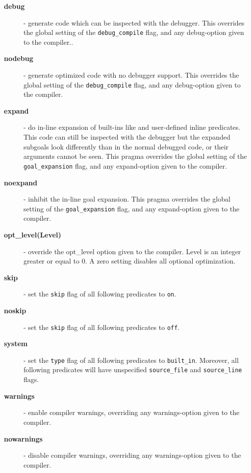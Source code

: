 \begin{description}
\item[{\bf debug}] - generate code which can be inspected with the
debugger.
This overrides the global setting of the {\tt debug_compile} flag,
and any debug-option given to the compiler..

\item[{\bf nodebug}] - generate optimized code with no debugger support.
This overrides the global setting of the {\tt debug_compile} flag,
and any debug-option given to the compiler.

\item[{\bf expand}] - do in-line expansion of built-ins 
like  and user-defined
inline predicates.
This code can still be inspected with the debugger but the expanded
subgoals look differently than in the normal debugged code,
or their arguments cannot be seen.
This pragma overrides the global setting of the {\tt goal_expansion} flag,
and any expand-option given to the compiler.

\item[{\bf noexpand}] - inhibit the in-line goal expansion.
This pragma overrides the global setting of the {\tt goal_expansion} flag,
and any expand-option given to the compiler.

\item[{\bf opt_level(Level)}] - override the opt_level option given to the
compiler. Level is an integer greater or equal to 0.  A zero setting disables
all optional optimization.

\item[{\bf skip}] - set the {\tt skip} flag of all following
predicates to {\tt on}.

\item[{\bf noskip}] - set the {\tt skip} flag of all following
predicates to {\tt off}.

\item[{\bf system}] - set the {\tt type} flag of all following
predicates to {\tt built_in}.
Moreover, all following predicates will have unspecified
{\tt source_file} and {\tt source_line} flags.

\item[{\bf warnings}] - enable compiler warnings, overriding any
warnings-option given to the compiler.

\item[{\bf nowarnings}] - disable compiler warnings, overriding any
warnings-option given to the compiler.

\end{description}

